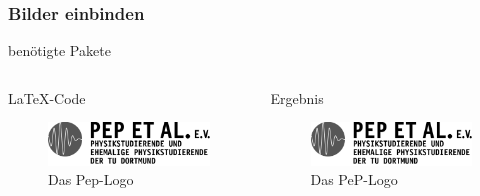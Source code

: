 \begin{frame}[fragile]
    \frametitle{Bilder einbinden}
    \begin{block}{benötigte Pakete}
        \begin{lstverbatim}
        \usepackage{graphicx}
        \usepackage[labelfont=bf]{caption}
        \end{lstverbatim}
    \end{block}
    \begin{columns}[T]
        \begin{column}{0.6\textwidth}
            \begin{block}{\LaTeX-Code}
                \begin{lstverbatim}
                \begin{figure}
                    \centering
                    \includegraphics[width=\textwidth]{./peplogo.pdf}
                    \caption{Das Pep-Logo}
                    \label{fig:peplogo}
                \end{figure}
                \end{lstverbatim}
            \end{block}
        \end{column}
        \begin{column}{0.35\textwidth}
            \begin{block}{Ergebnis}
                \begin{figure}
                    \centering
                    \includegraphics[width=\textwidth]{./peplogo.pdf}
                    \caption{Das PeP-Logo}
                    \label{fig:peplogo}
                \end{figure}
            \end{block}
        \end{column}
    \end{columns}
\end{frame}

